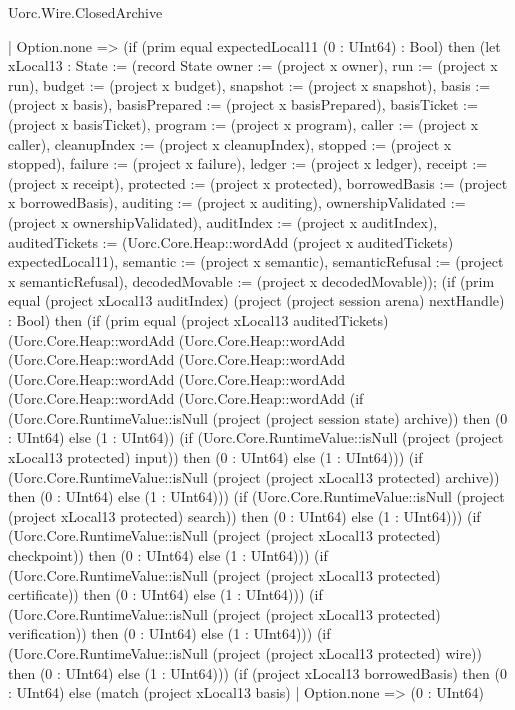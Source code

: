 \begin{lexlean}{Uorc.Wire.ClosedArchive}
\begin{semanticmodule}
{    | Option.none => (if (prim equal expectedLocal11 (0 : UInt64) : Bool) then (let xLocal13 : State := (record State {owner := (project x owner), run := (project x run), budget := (project x budget), snapshot := (project x snapshot), basis := (project x basis), basisPrepared := (project x basisPrepared), basisTicket := (project x basisTicket), program := (project x program), caller := (project x caller), cleanupIndex := (project x cleanupIndex), stopped := (project x stopped), failure := (project x failure), ledger := (project x ledger), receipt := (project x receipt), protected := (project x protected), borrowedBasis := (project x borrowedBasis), auditing := (project x auditing), ownershipValidated := (project x ownershipValidated), auditIndex := (project x auditIndex), auditedTickets := (Uorc.Core.Heap::wordAdd (project x auditedTickets) expectedLocal11), semantic := (project x semantic), semanticRefusal := (project x semanticRefusal), decodedMovable := (project x decodedMovable)}); (if (prim equal (project xLocal13 auditIndex) (project (project session arena) nextHandle) : Bool) then (if (prim equal (project xLocal13 auditedTickets) (Uorc.Core.Heap::wordAdd (Uorc.Core.Heap::wordAdd (Uorc.Core.Heap::wordAdd (Uorc.Core.Heap::wordAdd (Uorc.Core.Heap::wordAdd (Uorc.Core.Heap::wordAdd (Uorc.Core.Heap::wordAdd (Uorc.Core.Heap::wordAdd (if (Uorc.Core.RuntimeValue::isNull (project (project session state) archive)) then (0 : UInt64) else (1 : UInt64)) (if (Uorc.Core.RuntimeValue::isNull (project (project xLocal13 protected) input)) then (0 : UInt64) else (1 : UInt64))) (if (Uorc.Core.RuntimeValue::isNull (project (project xLocal13 protected) archive)) then (0 : UInt64) else (1 : UInt64))) (if (Uorc.Core.RuntimeValue::isNull (project (project xLocal13 protected) search)) then (0 : UInt64) else (1 : UInt64))) (if (Uorc.Core.RuntimeValue::isNull (project (project xLocal13 protected) checkpoint)) then (0 : UInt64) else (1 : UInt64))) (if (Uorc.Core.RuntimeValue::isNull (project (project xLocal13 protected) certificate)) then (0 : UInt64) else (1 : UInt64))) (if (Uorc.Core.RuntimeValue::isNull (project (project xLocal13 protected) verification)) then (0 : UInt64) else (1 : UInt64))) (if (Uorc.Core.RuntimeValue::isNull (project (project xLocal13 protected) wire)) then (0 : UInt64) else (1 : UInt64))) (if (project xLocal13 borrowedBasis) then (0 : UInt64) else (match (project xLocal13 basis)
      | Option.none => (0 : UInt64)
}
\end{semanticmodule}
\end{lexlean}
